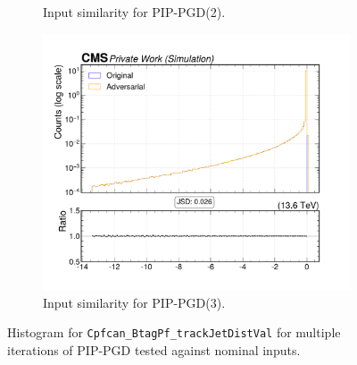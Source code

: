 \begin{figure}[htbp]
\begin{subfigure}[t]{0.32\textwidth}
    \caption*{Input similarity for PIP-PGD(2).}
  \end{subfigure}\hfill
  \begin{subfigure}[t]{0.32\textwidth}
    \includegraphics[width=\linewidth]{media/output/features/compare/combined_it_3/cmp_cpf_arr_Cpfcan_BtagPf_trackJetDistVal.pdf}
    \caption*{Input similarity for PIP-PGD(3).}
  \end{subfigure}

  \caption*{Histogram for \texttt{Cpfcan\_BtagPf\_trackJetDistVal} for multiple iterations of PIP-PGD tested against nominal inputs.}
  \label{fig:combined_input_Cpfcan_BtagPf_trackJetDistVal}
\end{figure}

